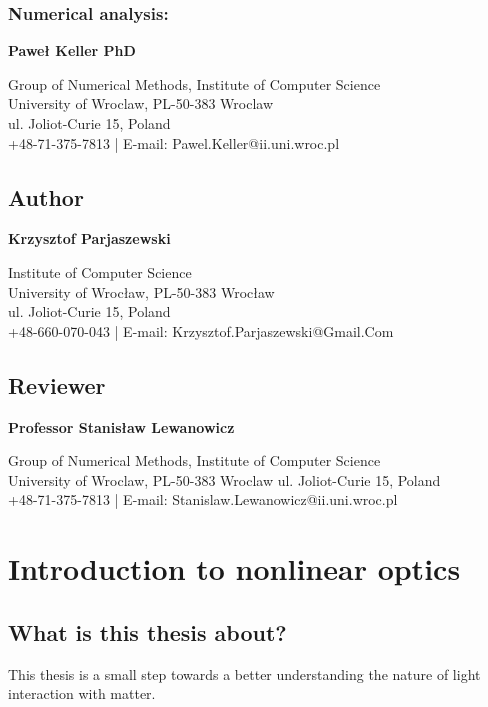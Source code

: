 \documentclass[12pt,twoside,a4paper]{article}
\numberwithin{equation}{subsection}
\numberwithin{figure}{subsection}
\begin{document}
\subsubsection*{Numerical analysis:}

\textbf{Paweł Keller PhD}

Group of Numerical Methods, Institute of Computer Science \\
University of Wroclaw, PL-50-383 Wroclaw \\
ul. Joliot-Curie 15, Poland \\
+48-71-375-7813 | E-mail: Pawel.Keller@ii.uni.wroc.pl

\subsection*{Author}  \label{chap:abstract_author}

\textbf{Krzysztof Parjaszewski}

Institute of Computer Science \\
University of Wrocław, PL-50-383 Wrocław \\
ul. Joliot-Curie 15, Poland \\
+48-660-070-043 | E-mail: Krzysztof.Parjaszewski@Gmail.Com

\subsection*{Reviewer}  \label{chap:abstract_reviewer}

\textbf{Professor Stanisław Lewanowicz}

Group of Numerical Methods, Institute of Computer Science \\
University of Wroclaw, PL-50-383 Wroclaw
ul. Joliot-Curie 15, Poland \\
+48-71-375-7813 | E-mail: Stanislaw.Lewanowicz@ii.uni.wroc.pl

\section{Introduction to nonlinear optics}  \label{chap:introducion}

\subsection{What is this thesis about?} \label{chap:introducion_what}

This thesis is a small step towards a better understanding the nature of light interaction with matter.
\end{document}
